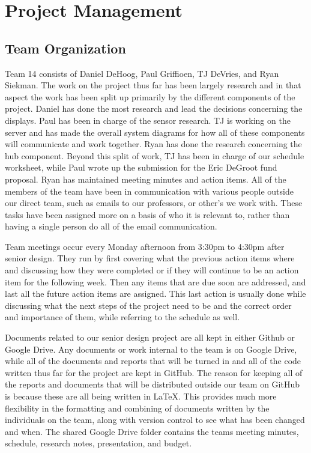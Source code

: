 \documentclass[PPFS.tex]{template/subfiles}
\begin{document}
\section{Project Management}
    \subsection{Team Organization}
	Team 14 consists of Daniel DeHoog, Paul Griffioen, TJ DeVries, and Ryan Siekman. The work on the project thus far has been largely research and in that aspect the work has been split up primarily by the different components of the project. Daniel has done the most research and lead the decisions concerning the displays. Paul has been in charge of the sensor research. TJ is working on the server and has made the overall system diagrams for how all of these components will communicate and work together. Ryan has done the research concerning the hub component. Beyond this split of work, TJ has been in charge of our schedule worksheet, while Paul wrote up the submission for the Eric DeGroot fund proposal. Ryan has maintained meeting minutes and action items. All of the members of the team have been in communication with various people outside our direct team, such as emails to our professors, or other's we work with. These tasks have been assigned more on a basis of who it is relevant to, rather than having a single person do all of the email communication. 

	Team meetings occur every Monday afternoon from 3:30pm to 4:30pm after senior design. They run by first covering what the previous action items where and discussing how they were completed or if they will continue to be an action item for the following week. Then any items that are due soon are addressed, and last all the future action items are assigned. This last action is usually done while discussing what the next steps of the project need to be and the correct order and importance of them, while referring to the schedule as well.

	Documents related to our senior design project are all kept in either Github or Google Drive. Any documents or work internal to the team is on Google Drive, while all of the documents and reports that will be turned in and all of the code written thus far for the project are kept in GitHub. The reason for keeping all of the reports and documents that will be distributed outside our team on GitHub is because these are all being written in \LaTeX. This provides much more flexibility in the formatting and combining of documents written by the individuals on the team, along with version control to see what has been changed and when. The shared Google Drive folder contains the teams meeting minutes, schedule, research notes, presentation, and budget.
	
\end{document}
